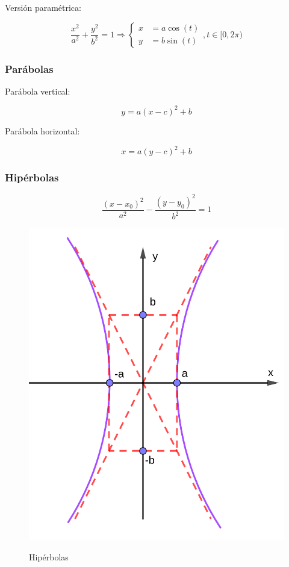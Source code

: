 \documentclass{article}
\begin{document}
Versión paramétrica:

\begin{equation}
\frac{x^2}{a^2} + \frac{y^2}{b^2} = 1 \Rightarrow
\left\{
\begin{array}{ll}
x &= a \cos(t) \\
y &= b \sin(t)
\end{array}
\right., t \in [0, 2\pi)
\end{equation}

\subsubsection{Parábolas}

Parábola vertical:

\begin{equation}
y = a (x-c)^2 + b
\end{equation}

Parábola horizontal:

\begin{equation}
x = a (y-c)^2 + b
\end{equation}

\subsubsection{Hipérbolas}

\begin{equation}
\frac{(x-x_0)^2}{a^2} - \frac{(y-y_0)^2}{b^2} = 1
\end{equation}

\begin{figure}[ht]
\caption{Hipérbolas}
\includegraphics[scale=0.8]{img/rn/hiperbolas.png} 
\centering
\label{fig:hiperbolas}
\end{figure}
\end{document}
